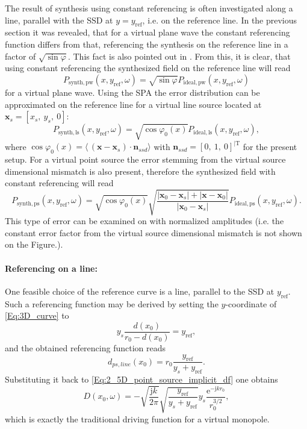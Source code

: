 \documentclass[12pt,a4paper]{article}
\newcommand{\te}{\mathrm{e}}
\newcommand{\ti}{\mathrm{j}}
\newcommand{\sinfi}{\sin\varphi}
\newcommand{\cosfi}{\cos\varphi}
\newcommand{\yref}{y_{\mathrm{ref}}}
\newcommand{\vx}{\mathbf{x}}
\newcommand{\vxo}{\mathbf{x}_0}
\begin{document}
\vspace{3mm}
The result of synthesis using constant referencing is often investigated along a line, parallel with the SSD at $y=\yref$, i.e. on the reference line. In the previous section it was revealed, that for a virtual plane wave  the constant referencing function differs from that, referencing the synthesis on the reference line in a factor of $\sqrt{\sinfi}$. This fact is also pointed out in \cite[3.9.4]{Ahrens2012}. From this, it is clear, that using constant referencing the synthesized field on the reference line will read
\begin{equation}
P_{\mathrm{synth,pw}}(x,\yref,\omega) = \sqrt{\sinfi} P_{\mathrm{ideal,pw}}(x,\yref,\omega) 
\end{equation}
for a virtual plane wave. Using the SPA the error distribution can be approximated on the reference line for a virtual line source located at $\mathbf{x}_s = [x_s,\ y_s,\ 0]$:
\begin{equation}
P_{\mathrm{synth,ls}}(x,\yref,\omega) = \sqrt{\cosfi_0(x)} P_{\mathrm{ideal,ls}}(x,\yref,\omega),
\end{equation}
where $\cosfi_0(x) = \langle\, ( \vx- \mathbf{x}_s ) \cdot \mathbf{n}_{ssd}\rangle$ with $\mathbf{n}_{ssd} = [0,\ 1,\ 0]^{|\mathrm{T}}$ for the present setup.
For a virtual point source the error stemming from the virtual source dimensional mismatch is also present, therefore the synthesized field with constant referencing will read
\begin{equation}
P_{\mathrm{synth,ps}}(x,\yref,\omega) = \sqrt{\cosfi_0(x)} 
\sqrt{\frac{ | \vxo - \mathbf{x}_s | + | \vx - \vxo| }{ | \vxo - \mathbf{x}_s |}} 
P_{\mathrm{ideal,ps}}(x,\yref,\omega).
\end{equation}
This type of error can be examined on \cite[Fig.5.13.]{Ahrens2012} with normalized amplitudes (i.e. the constant error factor from the virtual source dimensional mismatch is not shown on the Figure.).

\paragraph{Referencing on a line:\\}
One feasible choice of the reference curve is a line, parallel to the SSD at $\yref$. Such a referencing function may be derived by setting the $y$-coordinate of \eqref{Eq:3D_curve} to
\begin{equation}
y_s \frac{d(x_0)}{r_0 - d(x_0)} = \yref,
\end{equation}
and the obtained referencing function reads
\begin{equation}
d_{ps,line}(x_0) = r_0 \frac{\yref}{y_s + \yref}.
\end{equation}
Substituting it back to \eqref{Eq:2_5D_point_source_implicit_df} one obtains
\begin{equation}
D(x_0,\omega) = 
- \sqrt{\frac{\ti k}{2\pi}} \sqrt{\frac{\yref}{y_s + \yref}}  y_s \frac{\te^{-\ti k r_0 }}{r_0^{3/2}},
\end{equation}
which is exactly the traditional driving function for a virtual monopole.
\end{document}
